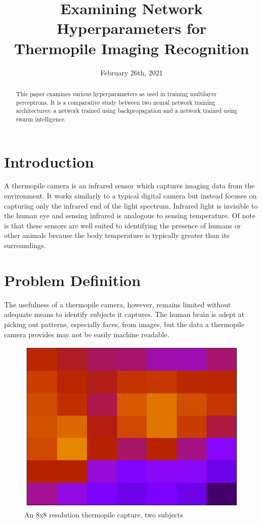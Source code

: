 \documentclass[a4paper,12pt]{article}
\title{Examining Network Hyperparameters for \\ Thermopile Imaging Recognition}
\author{}
\date{February 26th, 2021}
\begin{document}
\maketitle

\begin{abstract}
This paper examines various hyperparameters as used in training multilayer perceptrons. It is a comparative study between two neural network training architectures: a network trained using backpropagation and a network trained using swarm intelligence.
\end{abstract}

\section{Introduction}
A thermopile camera is an infrared sensor which captures imaging data from the environment. It works similarly to a typical digital camera but instead focuses on capturing only the infrared end of the light spectrum. Infrared light is invisible to the human eye and sensing infrared is analogous to sensing temperature. Of note is that these sensors are well suited to identifying the presence of humans or other animals because the body temperature is typically greater than its surroundings.

\section{Problem Definition}
The usefulness of a thermopile camera, however, remains limited without adequate means to identify subjects it captures. The human brain is adept at picking out patterns, especially faces, from images, but the data a thermopile camera provides may not be easily machine readable.

\begin{figure}[h!]
\centering
\includegraphics[scale=0.35]{images/heat1.png}
\caption{An 8x8 resolution thermopile capture, two subjects}
\label{fig:heatmap1}
\end{figure}
\end{document}

